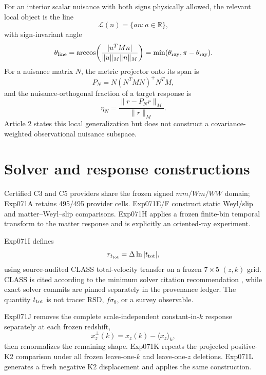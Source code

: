 \documentclass[11pt]{article}
\newcommand{\ttot}{t_{\rm tot}}
\newcommand{\dln}{\Delta\ln}
\begin{document}
For an interior scalar nuisance with both signs physically allowed, the relevant local object is the line
\begin{equation}
\mathcal{L}(n)=\{a n:a\in\mathbb{R}\},
\end{equation}
with sign-invariant angle
\begin{equation}
\theta_{\rm line}=\arccos\!\left(\frac{|u^T M n|}{\|u\|_M\|n\|_M}\right)
=\min(\theta_{\rm ray},\pi-\theta_{\rm ray}).
\end{equation}
For a nuisance matrix $N$, the metric projector onto its span is
\begin{equation}
P_N=N(N^T M N)^+N^T M,
\end{equation}
and the nuisance-orthogonal fraction of a target response is
\begin{equation}
\eta_N=\frac{\|r-P_Nr\|_M}{\|r\|_M}.
\end{equation}
Article 2 states this local generalization but does not construct a covariance-weighted observational nuisance subspace.

\section{Solver and response constructions}
Certified C3 and C5 providers share the frozen signed $mm/Wm/WW$ domain; Exp071A retains 495/495 provider cells. Exp071E/F construct static Weyl/slip and matter--Weyl--slip comparisons. Exp071H applies a frozen finite-bin temporal transform to the matter response and is explicitly an oriented-ray experiment.

Exp071I defines
\begin{equation}
r_{\ttot}=\dln|\ttot|,
\end{equation}
using source-audited CLASS total-velocity transfer on a frozen $7\times5$ $(z,k)$ grid. CLASS is cited according to the minimum solver citation recommendation \citep{BlasLesgourguesTram2011CLASSII}, while exact solver commits are pinned separately in the provenance ledger. The quantity $\ttot$ is not tracer RSD, $f\sigma_8$, or a survey observable.

Exp071J removes the complete scale-independent constant-in-$k$ response separately at each frozen redshift,
\begin{equation}
x_z^\perp(k)=x_z(k)-\langle x_z\rangle_k,
\end{equation}
then renormalizes the remaining shape. Exp071K repeats the projected positive-K2 comparison under all frozen leave-one-$k$ and leave-one-$z$ deletions. Exp071L generates a fresh negative K2 displacement and applies the same construction.
\end{document}
